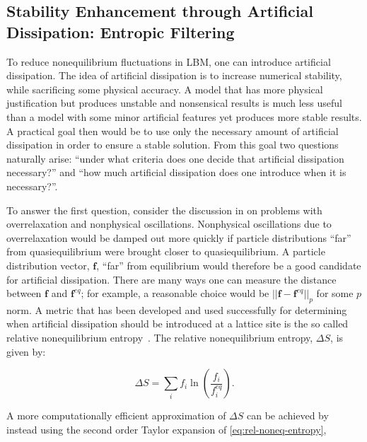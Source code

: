 \documentclass[pdftex,ms]{pittetd}
\begin{document}
\subsection{Stability Enhancement through Artificial Dissipation: Entropic Filtering}

To reduce nonequilibrium fluctuations in LBM, one can introduce artificial dissipation.
The idea of artificial dissipation is to increase numerical stability, while sacrificing some physical accuracy.
A model that has more physical justification but produces unstable and nonsensical results is much less useful than a model with some minor artificial features yet produces more stable results.
A practical goal then would be to use only the necessary amount of artificial dissipation in order to ensure a stable solution.
From this goal two questions naturally arise: ``under what criteria does one decide that artificial dissipation necessary?'' and ``how much artificial dissipation does one introduce when it is necessary?''.

To answer the first question, consider the discussion in  on problems with overrelaxation and nonphysical oscillations.
Nonphysical oscillations due to overrelaxation would be damped out more quickly if particle distributions ``far'' from quasiequilibrium were brought closer to quasiequilibrium.
A particle distribution vector, $\mathbf{f}$, ``far'' from equilibrium would therefore be a good candidate for artificial dissipation.
There are many ways one can measure the distance between $\mathbf{f}$ and $\mathbf{f}^{eq}$; for example, a reasonable choice would be $||\mathbf{f} - \mathbf{f}^{eq}||_p$ for some $p$ norm.
A metric that has been developed and used successfully for determining when artificial dissipation should be introduced at a lattice site is the so called relative nonequilibrium entropy~\cite{gorban2014enhancement,brownlee2006stabilization,brownlee2007stability,brownlee2008nonequilibrium,packwood2009entropy}.
The relative nonequilibrium entropy, $\Delta S$, is given by:

\begin{equation} \label{eq:rel-noneq-entropy}
\Delta S = \sum_i f_i \ln(\frac{f_i}{f^{eq}_i}).
\end{equation}

\noindent A more computationally efficient approximation of $\Delta S$ can be achieved by instead using the second order Taylor expansion of \eqref{eq:rel-noneq-entropy},
\end{document}
